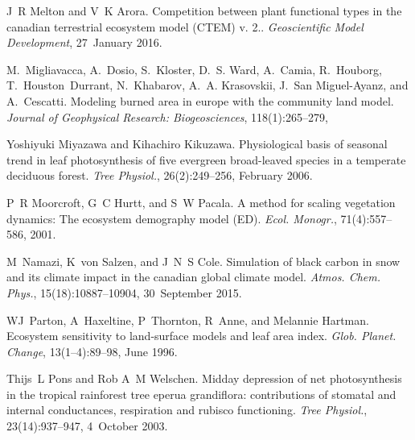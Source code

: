 \begin{DoxyDescription}
\item[\label{_CITEREF_Melton2016-zx}%
\mbox{[}58\mbox{]}]J~R Melton and V~K Arora. Competition between plant functional types in the canadian terrestrial ecosystem model (C\+T\+E\+M) v. 2.. {\itshape Geoscientific Model Development}, 27~January 2016. 


\item[\label{_CITEREF_Migliavacca2013-eh}%
\mbox{[}59\mbox{]}]M.~Migliavacca, A.~Dosio, S.~Kloster, D.~S. Ward, A.~Camia, R.~Houborg, T.~Houston~Durrant, N.~Khabarov, A.~A. Krasovskii, J.~San Miguel-\/\+Ayanz, and A.~Cescatti. Modeling burned area in europe with the community land model. {\itshape Journal of Geophysical Research\+: Biogeosciences}, 118(1)\+:265--279,
\begin{DoxyEnumerate}
\item 
\end{DoxyEnumerate}


\item[\label{_CITEREF_Miyazawa2006-so}%
\mbox{[}60\mbox{]}]Yoshiyuki Miyazawa and Kihachiro Kikuzawa. Physiological basis of seasonal trend in leaf photosynthesis of five evergreen broad-\/leaved species in a temperate deciduous forest. {\itshape Tree Physiol.}, 26(2)\+:249--256, February 2006.


\item[\label{_CITEREF_Moorcroft2001-co}%
\mbox{[}61\mbox{]}]P~R Moorcroft, G~C Hurtt, and S~W Pacala. A method for scaling vegetation dynamics\+: The ecosystem demography model (E\+D). {\itshape Ecol. Monogr.}, 71(4)\+:557--586, 2001. 


\item[\label{_CITEREF_Namazi2015-wz}%
\mbox{[}62\mbox{]}]M~Namazi, K~von Salzen, and J~N~S Cole. Simulation of black carbon in snow and its climate impact in the canadian global climate model. {\itshape Atmos. Chem. Phys.}, 15(18)\+:10887--10904, 30~September 2015. 


\item[\label{_CITEREF_Parton1996-zv}%
\mbox{[}63\mbox{]}]W\+J~Parton, A~Haxeltine, P~Thornton, R~Anne, and Melannie Hartman. Ecosystem sensitivity to land-\/surface models and leaf area index. {\itshape Glob. Planet. Change}, 13(1–4)\+:89--98, June 1996. 


\item[\label{_CITEREF_Pons2003-f26}%
\mbox{[}64\mbox{]}]Thijs~L Pons and Rob A~M Welschen. Midday depression of net photosynthesis in the tropical rainforest tree eperua grandiflora\+: contributions of stomatal and internal conductances, respiration and rubisco functioning. {\itshape Tree Physiol.}, 23(14)\+:937--947, 4~October 2003.



\end{DoxyDescription}
